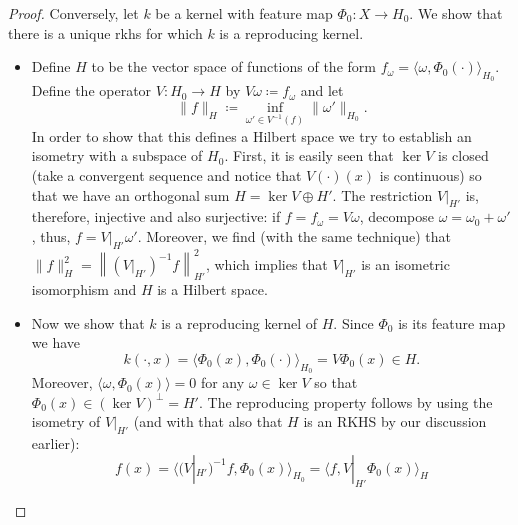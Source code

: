 \begin{proof}
    Conversely, let $k$ be a kernel with feature map 
    $\Phi_0 \colon X \to H_0$.
    We show that there is a unique rkhs for which $k$ is 
    a reproducing kernel.
    \begin{itemize}
        \item Define $H$ to be the vector space of functions
            of the form 
            $f_\omega = \langle \omega, \Phi_0(\cdot) \rangle_{H_0}$.
            Define the operator $V \colon H_0 \to H$ by 
            $V\omega \coloneqq f_\omega$ and let 
            \begin{equation*}
                \| f \|_H \coloneqq 
                    \inf_{\omega' \in V^{-1}(f)} 
                    \| \omega' \|_{H_0}.
            \end{equation*}
            In order to show that this defines a Hilbert space
            we try to establish an isometry with a subspace of 
            $H_0$.
            First, it is easily seen that $\ker V$ is closed 
            (take a convergent sequence and notice that 
            $V(\cdot)(x)$ is continuous)
            so that we have an orthogonal sum 
            $H = \ker V \oplus H'$.
            The restriction $V|_{H'}$ is, therefore, injective
            and also surjective:
            if $f = f_\omega = V \omega$, decompose 
            $\omega = \omega_0 + \omega'$, thus, 
            $f = V|_{H'} \omega'$.
            Moreover, we find (with the same technique) that
            $\|f\|_H^2 = \left\|(V|_{H'})^{-1} f \right\|_{H'}^2$,
            which implies that $V|_{H'}$ is an isometric isomorphism
            and $H$ is a Hilbert space.
        \item Now we show that $k$ is a reproducing kernel of $H$.
            Since $\Phi_0$ is its feature map we have
            \begin{equation*}
                k(\cdot,x) 
                    = \langle \Phi_0(x), \Phi_0(\cdot) \rangle_{H_0}
                    = V \Phi_0(x) \in H.
            \end{equation*}
            Moreover, $\langle \omega, \Phi_0(x) \rangle = 0$ for 
            any $\omega \in \ker V$ so that 
            $\Phi_0(x) \in (\ker V)^\perp = H'$.
            The reproducing property follows by using the 
            isometry of $V|_{H'}$ 
            (and with that also that $H$ is an RKHS by our discussion 
            earlier):
            \begin{equation*}
                f(x) = \langle (V|_{H'})^{-1} f, \Phi_0(x) \rangle_{H_0}
                    = \langle f, V|_{H'} \Phi_0(x) \rangle_H

\end{equation*}
\end{itemize}
\end{proof}
